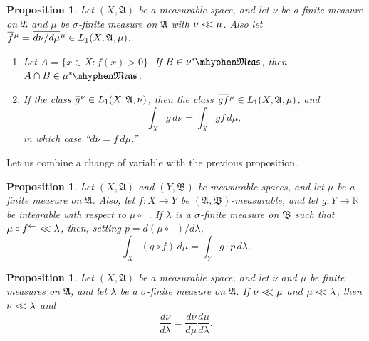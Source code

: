 \documentclass[
twoside=true,
paper=letter,
fontsize=9pt,
pagesize=auto,
leqno,
openany,
headsepline,
overfullrule,
]{scrbook}
\theoremstyle{plain}
\theoremstyle{plain}
\newtheorem{prop}[thm]{Proposition}
\theoremstyle{definition}
\theoremstyle{bfnoteitalic}
\theoremstyle{bfnoteroman}
\newcommand{\sigalg}[1]{\mathfrak{#1}}
\newcommand{\textsigma}{\hbox{\large{$\sigma$}}\kern-1pt}
\newcommand{\preimage}[1]{\mathop{#1^{\leftarrow}}}
\newcommand{\R}{\mathbb{R}}
\newcommand{\meets}{\cap}
\newcommand{\sigmaalgebra}{\sigalg{A}}
\newcommand{\sigmaalgebraii}{\sigalg{B}}
\newcommand{\measurable}[1]{{#1}\mhyphen\mathfrak{Meas}}
\newcommand{\kernast}{\ast\kern-1pt}
\newcommand{\funcf}{f}
\newcommand{\funcg}{g}
\newcommand{\function}{f}
\newcommand{\functionii}{g}
\newcommand{\measurespace}{X}
\newcommand{\measurespaceii}{Y}
\newcommand{\mspaceelt}{x}
\newcommand{\abscont}{\mathrel{< \kern-3.5pt <}}
\newcommand{\measure}{\mu}
\newcommand{\measmu}{\mu}
\newcommand{\measureii}{\nu}
\newcommand{\measureiii}{\lambda}
\newcommand{\measlambda}{\lambda}
\newcommand{\seti}{A}
\newcommand{\setii}{B}
\newcommand*\xbar[1]{%
   \hbox{%
     \vbox{%
       \hrule height 0.4pt %
       \kern0.4ex%
       \hbox{%
         \ensuremath{#1}%
       }%
     }%
   }%
}
\newcommand{\lebclass}[1]{\hspace{.5pt}\xbar{#1}\hspace{0.5pt}}
\newcommand{\ellclass}[2]{\lebclass{#1}^{#2}}
\begin{document}
\begin{prop}\label{radon_nikodym_corollary}
Let $(\measurespace,\sigmaalgebra)$ be a measurable space, and let 
$\measureii$ be a finite measure on $\sigmaalgebra$ and $\measure$ be  \textsigma-finite measure on $\sigmaalgebra$ 
with $\measureii\abscont\measure$.
Also let 
$\ellclass{\function}{\measure}
= \ellclass{d\measureii/d\measure}{\measure}
\in
L_1(\measurespace,\sigmaalgebra,\measure)$.
\begin{enumerate}
\item
Let
$\seti = \{ \mspaceelt\in\measurespace : 
\function(\mspaceelt) > 0 \}$. If
$\setii \in \measurable{\measureii^\kernast}$, then 
$\seti\meets\setii \in \measurable{\measure^\kernast}$.
\item
If the class
$\ellclass{\functionii}{\measureii}
\in
L_1(\measurespace,\sigmaalgebra,\measureii)$,
then the class
$\ellclass{\functionii\function}{\measure}
\in
L_1(\measurespace,\sigmaalgebra,\measure)$,
and 
\[
\int_\measurespace\functionii \, d\measureii
=
\int_\measurespace \functionii\function \,  d\measure,
\]
in which case
``$d\measureii =\function \,  d\measure$.''
\end{enumerate}
\end{prop}


Let us combine a change of variable with the previous proposition.

\begin{prop}\label{combine}
Let $(\measurespace, \sigmaalgebra)$ and $(\measurespaceii,\sigmaalgebraii)$ be measurable spaces, and let $\measmu$ be a finite measure on $\sigmaalgebra$.
Also, let
$\funcf:\measurespace\to\measurespaceii$ be
$(\sigmaalgebra, \sigmaalgebraii)$\hyp{}measurable,
and let $\funcg:\measurespaceii\to\R$ be integrable with respect to
$\measmu\circ\preimage{\funcf}$.
If $\measlambda$ is a \textsigma\hyp{}finite measure on $\sigmaalgebraii$ such that
$\measmu\circ\preimage{\funcf} \abscont \measlambda$, then, setting
$p = d(\measmu\circ\preimage{\funcf}) / d\measlambda$,
\[
\int_\measurespace (\funcg\circ\funcf)\, d\measmu
=
\int_\measurespaceii \funcg \cdot p \, d\measlambda.
\]
\end{prop}


\begin{prop}\label{chain_rule}
Let $(\measurespace,\sigmaalgebra)$ be a measurable space, and let 
$\measureii$ and $\measure$ be finite measures on $\sigmaalgebra$, and 
let $\measureiii$ be a \textsigma-finite measure on $\sigmaalgebra$.
If
$\measureii\abscont\measure$ and $\measure\abscont\measureiii$,
then $\measureii\abscont\measureiii$ and
\[
\frac{d\measureii}{d\measureiii}
=
\frac{d\measureii}{d\measure}
\frac{d\measure}{d\measureiii}.
\]
\end{prop}
\end{document}
